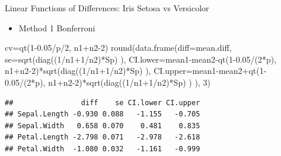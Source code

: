 \documentclass[
  ignorenonframetext,
]{beamer}
\newenvironment{Shaded}{\begin{snugshade}}{\end{snugshade}}
\newcommand{\AttributeTok}[1]{\textcolor[rgb]{0.77,0.63,0.00}{#1}}
\newcommand{\DecValTok}[1]{\textcolor[rgb]{0.00,0.00,0.81}{#1}}
\newcommand{\FloatTok}[1]{\textcolor[rgb]{0.00,0.00,0.81}{#1}}
\newcommand{\FunctionTok}[1]{\textcolor[rgb]{0.00,0.00,0.00}{#1}}
\newcommand{\NormalTok}[1]{#1}
\newcommand{\OtherTok}[1]{\textcolor[rgb]{0.56,0.35,0.01}{#1}}
\newcommand{\SpecialCharTok}[1]{\textcolor[rgb]{0.00,0.00,0.00}{#1}}
\providecommand{\tightlist}{%
  \setlength{\itemsep}{0pt}\setlength{\parskip}{0pt}}
\begin{document}
\begin{frame}[fragile]{Linear Functions of Differences: Iris Setosa vs
Versicolor}
\protect\hypertarget{linear-functions-of-differences-iris-setosa-vs-versicolor-3}{}
\begin{itemize}
\tightlist
\item
  Method 1 Bonferroni
\end{itemize}

\tiny

\begin{Shaded}
\begin{Highlighting}[]
\NormalTok{cv}\OtherTok{=}\FunctionTok{qt}\NormalTok{(}\DecValTok{1}\FloatTok{{-}0.05}\SpecialCharTok{/}\NormalTok{p}\SpecialCharTok{/}\DecValTok{2}\NormalTok{, n1}\SpecialCharTok{+}\NormalTok{n2}\DecValTok{{-}2}\NormalTok{)}
\FunctionTok{round}\NormalTok{(}\FunctionTok{data.frame}\NormalTok{(}\AttributeTok{diff=}\NormalTok{mean.diff, }\AttributeTok{se=}\FunctionTok{sqrt}\NormalTok{(}\FunctionTok{diag}\NormalTok{((}\DecValTok{1}\SpecialCharTok{/}\NormalTok{n1}\SpecialCharTok{+}\DecValTok{1}\SpecialCharTok{/}\NormalTok{n2)}\SpecialCharTok{*}\NormalTok{Sp) ),}
\AttributeTok{CI.lower=}\NormalTok{mean1}\SpecialCharTok{{-}}\NormalTok{mean2}\SpecialCharTok{{-}}\FunctionTok{qt}\NormalTok{(}\DecValTok{1}\FloatTok{{-}0.05}\SpecialCharTok{/}\NormalTok{(}\DecValTok{2}\SpecialCharTok{*}\NormalTok{p), n1}\SpecialCharTok{+}\NormalTok{n2}\DecValTok{{-}2}\NormalTok{)}\SpecialCharTok{*}\FunctionTok{sqrt}\NormalTok{(}\FunctionTok{diag}\NormalTok{((}\DecValTok{1}\SpecialCharTok{/}\NormalTok{n1}\SpecialCharTok{+}\DecValTok{1}\SpecialCharTok{/}\NormalTok{n2)}\SpecialCharTok{*}\NormalTok{Sp) ),}
\AttributeTok{CI.upper=}\NormalTok{mean1}\SpecialCharTok{{-}}\NormalTok{mean2}\SpecialCharTok{+}\FunctionTok{qt}\NormalTok{(}\DecValTok{1}\FloatTok{{-}0.05}\SpecialCharTok{/}\NormalTok{(}\DecValTok{2}\SpecialCharTok{*}\NormalTok{p), n1}\SpecialCharTok{+}\NormalTok{n2}\DecValTok{{-}2}\NormalTok{)}\SpecialCharTok{*}\FunctionTok{sqrt}\NormalTok{(}\FunctionTok{diag}\NormalTok{((}\DecValTok{1}\SpecialCharTok{/}\NormalTok{n1}\SpecialCharTok{+}\DecValTok{1}\SpecialCharTok{/}\NormalTok{n2)}\SpecialCharTok{*}\NormalTok{Sp) ) ), }\DecValTok{3}\NormalTok{)}
\end{Highlighting}
\end{Shaded}

\begin{verbatim}
##                diff    se CI.lower CI.upper
## Sepal.Length -0.930 0.088   -1.155   -0.705
## Sepal.Width   0.658 0.070    0.481    0.835
## Petal.Length -2.798 0.071   -2.978   -2.618
## Petal.Width  -1.080 0.032   -1.161   -0.999
\end{verbatim}

\normalsize
\end{frame}
\end{document}
